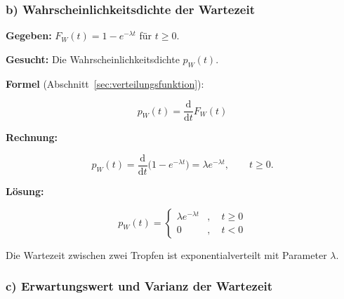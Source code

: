 \subsubsection*{b) Wahrscheinlichkeitsdichte der Wartezeit}

\begin{beispiel}

\textbf{Gegeben:} $F_W(t) = 1 - e^{-\lambda t}$ für $t \geq 0$.

\textbf{Gesucht:} Die Wahrscheinlichkeitsdichte $p_W(t)$.

\textbf{Formel} (Abschnitt~\ref{sec:verteilungsfunktion}):

$$
p_W(t) = \frac{\mathrm{d}}{\mathrm{d}t} F_W(t)
$$

\textbf{Rechnung:}

$$
p_W(t) = \frac{\mathrm{d}}{\mathrm{d}t}\bigl(1 - e^{-\lambda t}\bigr)
= \lambda e^{-\lambda t}, \qquad t \geq 0.
$$

\textbf{Lösung:}

$$
\boxed{\;p_W(t) = \begin{cases} \lambda e^{-\lambda t} & , \quad t \geq 0 \\[2pt]
0 & , \quad t < 0 \end{cases}\;}
$$

Die Wartezeit zwischen zwei Tropfen ist exponentialverteilt mit Parameter
$\lambda$.

\end{beispiel}

\subsubsection*{c) Erwartungswert und Varianz der Wartezeit}


